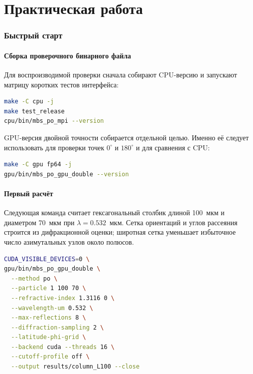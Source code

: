 \documentclass[11pt,a4paper]{article}
\begin{document}
\tableofcontents
\clearpage
{}

\part{Практическая работа}

\section{Быстрый старт}

\subsection{Сборка проверочного бинарного файла}

Для воспроизводимой проверки сначала собирают CPU-версию и запускают матрицу
коротких тестов интерфейса:

\begin{lstlisting}[language=bash]
make -C cpu -j
make test_release
cpu/bin/mbs_po_mpi --version
\end{lstlisting}

GPU-версия двойной точности собирается отдельной целью. Именно её следует
использовать для проверки точек $0^\circ$ и $180^\circ$ и для сравнения с CPU:

\begin{lstlisting}[language=bash]
make -C gpu fp64 -j
gpu/bin/mbs_po_gpu_double --version
\end{lstlisting}

\subsection{Первый расчёт}

Следующая команда считает гексагональный столбик длиной 100~мкм и диаметром
70~мкм при $\lambda=0.532$~мкм. Сетка ориентаций и углов рассеяния строится из
дифракционной оценки; широтная сетка уменьшает избыточное число азимутальных
узлов около полюсов.

\begin{lstlisting}[language=bash]
CUDA_VISIBLE_DEVICES=0 \
gpu/bin/mbs_po_gpu_double \
  --method po \
  --particle 1 100 70 \
  --refractive-index 1.3116 0 \
  --wavelength-um 0.532 \
  --max-reflections 8 \
  --diffraction-sampling 2 \
  --latitude-phi-grid \
  --backend cuda --threads 16 \
  --cutoff-profile off \
  --output results/column_L100 --close
\end{lstlisting}
\end{document}

